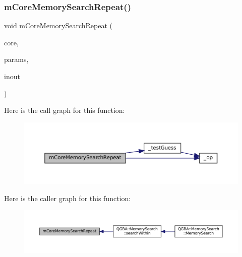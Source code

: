 \subsubsection{\texorpdfstring{m\+Core\+Memory\+Search\+Repeat()}{mCoreMemorySearchRepeat()}}
{\footnotesize\ttfamily void m\+Core\+Memory\+Search\+Repeat (\begin{DoxyParamCaption}\item[{struct m\+Core $\ast$}]{core,  }\item[{const struct m\+Core\+Memory\+Search\+Params $\ast$}]{params,  }\item[{struct m\+Core\+Memory\+Search\+Results $\ast$}]{inout }\end{DoxyParamCaption})}

Here is the call graph for this function\+:
\nopagebreak
\begin{figure}[H]
\begin{center}
\leavevmode
\includegraphics[width=350pt]{mem-search_8c_a6b178f5e5e77aaa20eb7a023ef35f2fe_cgraph}
\end{center}
\end{figure}
Here is the caller graph for this function\+:
\nopagebreak
\begin{figure}[H]
\begin{center}
\leavevmode
\includegraphics[width=350pt]{mem-search_8c_a6b178f5e5e77aaa20eb7a023ef35f2fe_icgraph}
\end{center}
\end{figure}
